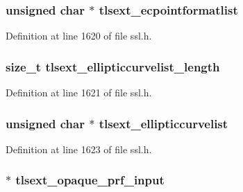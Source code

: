 \subsubsection[{\texorpdfstring{tlsext\+\_\+ecpointformatlist}{tlsext_ecpointformatlist}}]{\setlength{\rightskip}{0pt plus 5cm}unsigned char $\ast$ tlsext\+\_\+ecpointformatlist}\hypertarget{structssl__st_aed6a4a471306c6c96e1052966ed5b4cd}{}\label{structssl__st_aed6a4a471306c6c96e1052966ed5b4cd}


Definition at line 1620 of file ssl.\+h.

\subsubsection[{\texorpdfstring{tlsext\+\_\+ellipticcurvelist\+\_\+length}{tlsext_ellipticcurvelist_length}}]{\setlength{\rightskip}{0pt plus 5cm}size\+\_\+t tlsext\+\_\+ellipticcurvelist\+\_\+length}\hypertarget{structssl__st_a51510574a1159a9fb5ab06bf323945c6}{}\label{structssl__st_a51510574a1159a9fb5ab06bf323945c6}


Definition at line 1621 of file ssl.\+h.

\subsubsection[{\texorpdfstring{tlsext\+\_\+ellipticcurvelist}{tlsext_ellipticcurvelist}}]{\setlength{\rightskip}{0pt plus 5cm}unsigned char $\ast$ tlsext\+\_\+ellipticcurvelist}\hypertarget{structssl__st_afc8968e1fcae3767abbb9b981dc0ac75}{}\label{structssl__st_afc8968e1fcae3767abbb9b981dc0ac75}


Definition at line 1623 of file ssl.\+h.

\subsubsection[{\texorpdfstring{tlsext\+\_\+opaque\+\_\+prf\+\_\+input}{tlsext_opaque_prf_input}}]{ $\ast$ tlsext\+\_\+opaque\+\_\+prf\+\_\+input}\hypertarget{structssl__st_afd231ed43f1d6f4332cb51822953a4d2}{}\label{structssl__st_afd231ed43f1d6f4332cb51822953a4d2}


